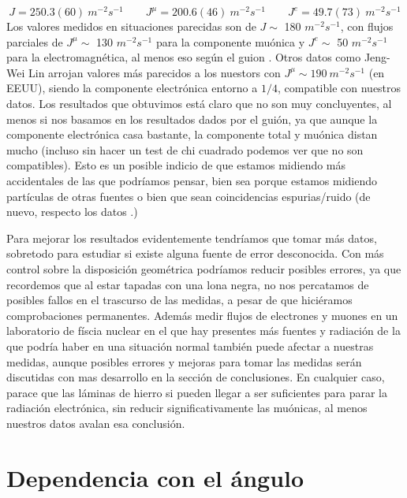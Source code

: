 \documentclass[11pt]{article}
\begin{document}
\begin{equation}
	J = 250.3(60)  \ \unit{m^{-2}s^{-1}} \qquad 
	J^\mu = 200.6(46) \ \unit{m^{-2}s^{-1}} \qquad 
	J^e = 49.7(73) \ \unit{m^{-2}s^{-1}}
\end{equation}
Los valores medidos en situaciones parecidas son de $ J \sim$ 180 $ \unit{m^{-2}s^{-1}}$, con flujos parciales de $J^\mu \sim$ 130 $ \unit{m^{-2}s^{-1}}$ para la componente muónica y $J^e \sim$ 50 $ \unit{m^{-2}s^{-1}}$ para la electromagnética, al menos eso según el guion \cite{P2}. Otros datos como Jeng-Wei Lin \cite{LIN201024} arrojan valores más parecidos a los nuestors con $J^\mu\sim 190 \ \unit{m^{-2}s^{-1}}$ (en EEUU), siendo la componente electrónica entorno a $1/4$, compatible con nuestros datos. Los resultados que obtuvimos está claro que no son muy concluyentes, al menos si nos basamos en los resultados dados por el guión, ya que aunque la componente electrónica casa bastante, la componente total y muónica distan mucho (incluso sin hacer un test de chi cuadrado podemos ver que no son compatibles). Esto es un posible indicio de que estamos midiendo más accidentales de las que podríamos pensar, bien sea porque estamos midiendo partículas de otras fuentes o bien que sean coincidencias espurias/ruido (de nuevo, respecto los datos \cite{P2}.)

Para mejorar los resultados evidentemente tendríamos que tomar más datos, sobretodo para estudiar si existe alguna fuente de error desconocida. Con más control sobre la disposición geométrica podríamos reducir posibles errores, ya que recordemos que al estar tapadas con una lona negra, no nos percatamos de posibles fallos en el trascurso de las medidas, a pesar de que hiciéramos comprobaciones permanentes. Además medir flujos de electrones y muones en un laboratorio de físcia nuclear en el que hay presentes más fuentes y radiación de la que podría haber en una situación normal también puede afectar a nuestras medidas, aunque posibles errores y mejoras para tomar las medidas serán discutidas con mas desarrollo en la sección de conclusiones. En cualquier caso, parace que las láminas de hierro si pueden llegar a ser suficientes para parar la radiación electrónica, sin reducir significativamente las muónicas, al menos nuestros datos avalan esa conclusión.

\section{Dependencia con el ángulo}
\end{document}
